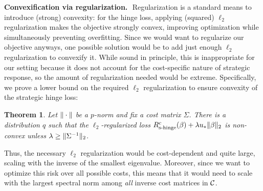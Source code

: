 \documentclass{article}
\newcommand{\costmatrix}{\Sigma}
\newcommand{\costset}{\gC}
\newcommand{\shingepoprisk}{R_{\textrm{s-hinge}}}
\newcommand{\uinv}{\ensuremath{u_{*}}}
\newtheorem{theorem}{Theorem}[section]
\theoremstyle{definition}
\renewcommand{\paragraph}[1]{{\textbf{#1}\,\,}}
\begin{document}
\paragraph{Convexification via regularization.}
Regularization is a standard means to introduce (strong) convexity:
for the hinge loss, applying (squared) $\ell_2$ regularization makes the objective strongly convex, improving optimization while simultaneously preventing overfitting.
Since we would want to regularize our objective anyways, one possible solution would be to add just enough $\ell_2$ regularization to convexify it.
While sound in principle, this is inappropriate for our setting because it does not account for the cost-specific nature of strategic response, so the amount of regularization needed would be extreme. Specifically, we prove a lower bound on the required $\ell_2$ regularization to ensure convexity of the strategic hinge loss:
\begin{theorem}
    \label{thm:cvx-regularization-ell2}
    Let $\| \cdot \|$ be a $p$-norm and fix a cost matrix $\costmatrix$. There is a distribution $q$ such that the $\ell_2$-regularized loss $\shingepoprisk^c(\beta) + \lambda \uinv \twonorm{\beta}$ is non-convex unless $\lambda \geq \twonorm{\costmatrix^{-1}}$.
\end{theorem}
Thus, the necessary $\ell_2$ regularization would be cost-dependent and quite large, scaling with the inverse of the smallest eigenvalue.
Moreover, since we want to optimize this risk over all possible costs, this means that it would need to scale with the largest spectral norm among \emph{all} inverse cost matrices in $\costset$. 
\end{document}
